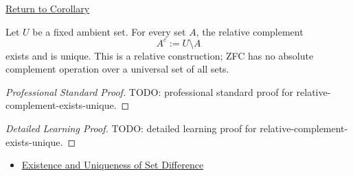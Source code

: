 \newpage
{}
\label{prf:relative-complement-exists-unique}

\begin{remark*}[Return]
\hyperref[cor:relative-complement-exists-unique]{Return to Corollary}
\end{remark*}

\begin{corollary*}
Let $U$ be a fixed ambient set. For every set $A$, the relative complement
\[
  A^c:=U\setminus A
\]
exists and is unique. This is a relative construction; ZFC has no absolute
complement operation over a universal set of all sets.
\end{corollary*}

\begin{proof}[Professional Standard Proof]
\LRAProofBodyStart
TODO: professional standard proof for relative-complement-exists-unique.
\end{proof}

\begin{proof}[Detailed Learning Proof]
\LRAProofBodyStart
TODO: detailed learning proof for relative-complement-exists-unique.
\end{proof}

\begin{remark*}
\end{remark*}

\begin{dependencies}
\begin{itemize}
  \item \hyperref[cor:set-difference-exists-unique]{Existence and Uniqueness of Set Difference}
\end{itemize}
\end{dependencies}

\clearpage
